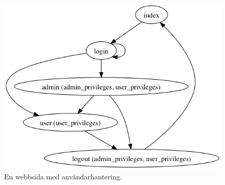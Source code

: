 \documentclass{article}
\begin{document}
\begin{figure}[htbp]
  \includegraphics[scale=0.5]{model.png}
\caption{En webbsida med användarhantering.}
\end{figure}

\begin{figure}

\end{figure}
\end{document}
